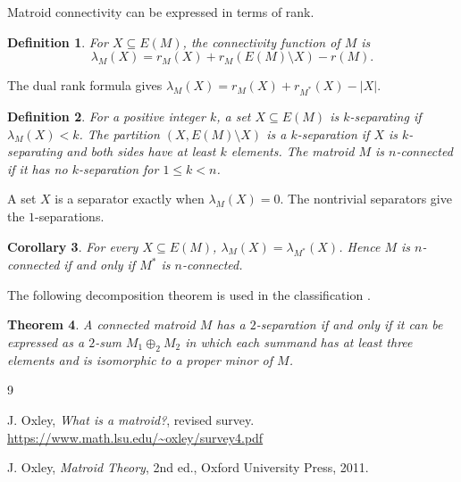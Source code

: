 \documentclass[11pt,letterpaper]{article}
\theoremstyle{appendix-result}
\newtheorem{theorem}{Theorem}[section]
\newtheorem{corollary}[theorem]{Corollary}
\theoremstyle{appendix-definition}
\newtheorem{definition}[theorem]{Definition}
\begin{document}
Matroid connectivity can be expressed in terms of rank.
\begin{definition}
    For $X\subseteq E(M)$, the connectivity function of $M$ is
    \[
        \lambda_M(X)=r_M(X)+r_M(E(M)\setminus X)-r(M).
    \]
\end{definition}
The dual rank formula gives $\lambda_M(X)=r_M(X)+r_{M^*}(X)-|X|$.
\begin{definition}
    For a positive integer $k$, a set $X\subseteq E(M)$ is $k$-separating if $\lambda_M(X)<k$. The partition $(X,E(M)\setminus X)$ is a $k$-separation if $X$ is $k$-separating and both sides have at least $k$ elements. The matroid $M$ is $n$-connected if it has no $k$-separation for $1\leq k<n$.
\end{definition}
A set $X$ is a separator exactly when $\lambda_M(X)=0$. The nontrivial separators give the $1$-separations.
\begin{corollary}
    For every $X\subseteq E(M)$, $\lambda_M(X)=\lambda_{M^*}(X)$. Hence $M$ is $n$-connected if and only if $M^*$ is $n$-connected.
\end{corollary}

The following decomposition theorem is used in the classification \cite[Section~8.3]{oxley}.
\begin{theorem}
    A connected matroid $M$ has a $2$-separation if and only if it can be expressed as a $2$-sum $M_1\oplus_2 M_2$ in which each summand has at least three elements and is isomorphic to a proper minor of $M$.
\end{theorem}

\begin{thebibliography}{9}

J. Oxley,
\textit{What is a matroid?},
revised survey.
\url{https://www.math.lsu.edu/~oxley/survey4.pdf}

J. Oxley,
\textit{Matroid Theory},
2nd ed., Oxford University Press, 2011.

\end{thebibliography}
\end{document}
